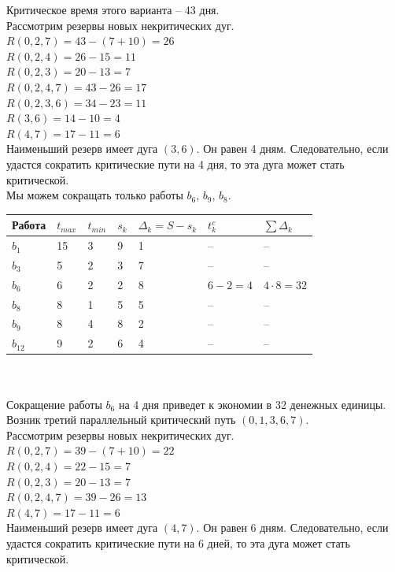 \documentclass[a4paper, 12pt]{report}
\begin{document}
	Критическое время этого варианта -- 43 дня.\\
	Рассмотрим резервы новых некритических дуг.\\
	$R(0,2,7)=43-(7+10)=26$\\
	$R(0,2,4)=26-15=11$\\
	$R(0,2,3)=20-13=7$\\
	$R(0,2,4,7)=43-26=17$\\
	$R(0,2,3,6)=34-23=11$\\
	$R(3,6)=14-10=4$\\
	$R(4,7)=17-11=6$\\
	Наименьший резерв имеет дуга $(3,6)$. Он равен 4 дням. Следовательно, если удастся сократить критические пути на 4 дня, то эта дуга может стать критической.\\
	Мы можем сокращать только работы $b_6$, $b_9$, $b_8$.\\
	\begin{tabular}{ |p{2cm}||p{1cm}||p{1cm}||p{1cm}||p{3cm}||p{2cm}||p{2cm}|}
		\hline
		Работа & $t_{max}$ & $t_{min}$ & $s_k$ & $\Delta_k=S-s_k$ & $t_k^c$& $\sum \Delta_k$\\
		\hline
		$b_1$ & 15 & 3 & 9 & 1 & -- & --\\
		$b_3$ & 5 & 2 & 3 & 7 & -- & --\\
		$b_6$ & 6 & 2 & 2 & 8 & $6-2=4$ & $4\cdot 8=32$\\
		$b_8$ & 8 & 1 & 5 & 5 & -- & --\\
		$b_{9}$ & 8 & 4 & 8 & 2 & -- & --\\
		$b_{12}$ & 9 & 2 & 6 & 4 & -- & --\\
		\hline
	\end{tabular}\\\\
	Сокращение работы $b_6$ на 4 дня приведет к экономии в 32 денежных единицы.
	Возник третий параллельный критический путь $(0, 1, 3, 6, 7)$.\\
	Рассмотрим резервы новых некритических дуг.\\
	$R(0,2,7)=39-(7+10)=22$\\
	$R(0,2,4)=22-15=7$\\
	$R(0,2,3)=20-13=7$\\
	$R(0,2,4,7)=39-26=13$\\
	$R(4,7)=17-11=6$\\
	Наименьший резерв имеет дуга $(4,7)$. Он равен 6 дням. Следовательно, если удастся сократить критические пути на 6 дней, то эта дуга может стать критической.\\
\end{document}
